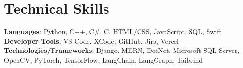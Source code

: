 \documentclass[letterpaper,11pt]{article}
\begin{document}
%
\section{Technical Skills}
 \begin{itemize}[leftmargin=0.15in, label={}]
    \small{\item{
     \textbf{Languages}{: Python, C++, C\#, C, HTML/CSS, JavaScript, SQL, Swift} \\
     \textbf{Developer Tools}{: VS Code, XCode, GitHub, Jira, Vercel} \\
     \textbf{Technologies/Frameworks}{: Django, MERN, DotNet, Microsoft SQL Server, OpenCV, PyTorch, TensorFlow, LangChain, LangGraph, Tailwind} \\
    }}
 \end{itemize}
 \vspace{-16pt}
\end{document}
